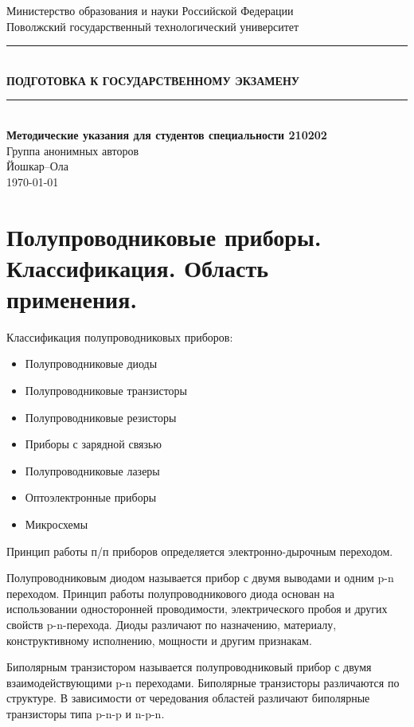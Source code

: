\documentclass[unicode, 12pt, a4paper, oneside]{article}
\begin{document}
\begin{titlepage}
	\begin{center}
		{\Large Министерство образования и науки Российской Федерации}\\[0.3cm]
		{\Large Поволжский государственный технологический университет}\\[4cm]
		\noindent\rule{\textwidth}{0.5mm}\\[0.5cm]
		{\LARGE\bfseries ПОДГОТОВКА К ГОСУДАРСТВЕННОМУ ЭКЗАМЕНУ}\\[0.2cm]
		\noindent\rule{\textwidth}{0.5mm}\\[2cm]
		{\large\bfseries Методические указания для студентов специальности 210202}\\[3cm]
		\vfill
		{\large Группа анонимных авторов\\[0.2cm] Йошкар--Ола\\[0.1cm] \today}
	\end{center}
\end{titlepage}

\section{Полупроводниковые приборы. Классификация. Область применения.}

Классификация полупроводниковых приборов:
\begin{itemize}
\item Полупроводниковые диоды
\item Полупроводниковые транзисторы
\item Полупроводниковые резисторы
\item Приборы с зарядной связью
\item Полупроводниковые лазеры
\item Оптоэлектронные приборы
\item Микросхемы
\end{itemize}

Принцип работы п/п приборов определяется электронно-дырочным переходом.

Полупроводниковым диодом называется прибор с двумя выводами и одним p-n переходом. Принцип работы полупроводникового диода основан на использовании односторонней проводимости, электрического пробоя и других свойств p-n-перехода. Диоды различают по назначению, материалу, конструктивному исполнению, мощности и другим признакам.

Биполярным транзистором называется полупроводниковый прибор с двумя взаимодействующими p-n переходами. Биполярные транзисторы различаются по структуре. В зависимости от чередования областей различают биполярные транзисторы типа p-n-p и n-p-n.
\end{document}
